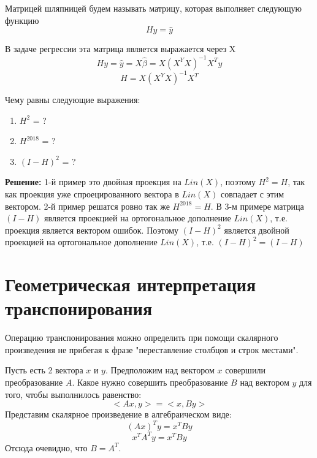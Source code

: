 \documentclass[12pt]{article} %
\theoremstyle{definition} %
\def \hb{\hat{\beta}}
\def \hy{\hat{y}}
\begin{document}
Матрицей шляпницей будем называть матрицу, которая выполняет следующую функцию
\[
Hy=\hy
\]

В задаче регрессии эта матрица является выражается через X
\[
Hy=\hy=X\hb = X(X^YX)^{-1}X^Ty
\]
\[
H = X(X^YX)^{-1}X^T
\]

Чему равны следующие выражения:
\begin{enumerate}
    \item $H^2$ = ?
    \item $H^{2018}$ = ?
    \item $(I-H)^2$ = ?
\end{enumerate}

\textbf{Решение:} 
1-й пример это двойная проекция на $Lin(X)$, поэтому $H^2 = H$, так как проекция уже спроецированного вектора в $Lin(X)$ совпадает с этим вектором. 2-й пример решатся ровно так же $H^{2018}=H$. В 3-м примере матрица $(I-H)$ является проекцией на ортогональное дополнение $Lin(X)$, т.е. проекция является вектором ошибок. Поэтому $(I-H)^2$ является двойной проекцией на ортогональное дополнение $Lin(X)$, т.е. $(I-H)^2=(I-H)$

\section{Геометрическая интерпретация транспонирования}

Операцию транспонирования можно определить при помощи скалярного произведения не прибегая к фразе "переставление столбцов и строк местами".

Пусть есть 2 вектора $x$ и $y$. Предположим над вектором $x$ совершили преобразование $A$. Какое нужно совершить преобразование $B$ над вектором $y$ для того, чтобы выполнилось равенство:
\[
<Ax,y>=<x,By>
\]
Представим скалярное произведение в алгебраическом виде:
\[
(Ax)^Ty=x^TBy
\]
\[
x^TA^Ty=x^TBy
\]
Отсюда очевидно, что $B=A^T$.
\end{document}
